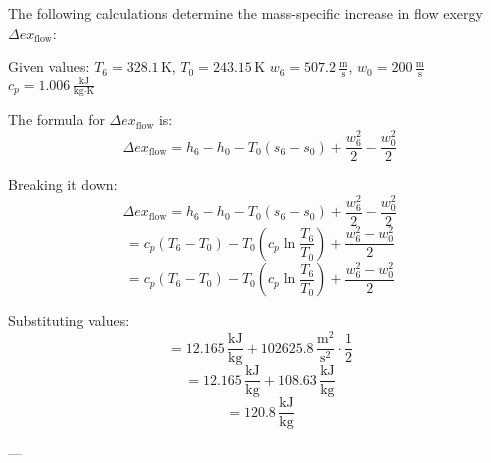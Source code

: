 The following calculations determine the mass-specific increase in flow exergy \( \Delta ex_{\text{flow}} \):

Given values:  
\( T_6 = 328.1 \, \text{K} \), \( T_0 = 243.15 \, \text{K} \)  
\( w_6 = 507.2 \, \frac{\text{m}}{\text{s}} \), \( w_0 = 200 \, \frac{\text{m}}{\text{s}} \)  
\( c_p = 1.006 \, \frac{\text{kJ}}{\text{kg·K}} \)

The formula for \( \Delta ex_{\text{flow}} \) is:  
\[
\Delta ex_{\text{flow}} = h_6 - h_0 - T_0 (s_6 - s_0) + \frac{w_6^2}{2} - \frac{w_0^2}{2}
\]

Breaking it down:  
\[
\Delta ex_{\text{flow}} = h_6 - h_0 - T_0 \left( s_6 - s_0 \right) + \frac{w_6^2}{2} - \frac{w_0^2}{2}
\]  
\[
= c_p (T_6 - T_0) - T_0 \left( c_p \ln \frac{T_6}{T_0} \right) + \frac{w_6^2 - w_0^2}{2}
\]  
\[
= c_p (T_6 - T_0) - T_0 \left( c_p \ln \frac{T_6}{T_0} \right) + \frac{w_6^2 - w_0^2}{2}
\]

Substituting values:  
\[
= 12.165 \, \frac{\text{kJ}}{\text{kg}} + 102625.8 \, \frac{\text{m}^2}{\text{s}^2} \cdot \frac{1}{2}
\]  
\[
= 12.165 \, \frac{\text{kJ}}{\text{kg}} + 108.63 \, \frac{\text{kJ}}{\text{kg}}
\]  
\[
= 120.8 \, \frac{\text{kJ}}{\text{kg}}
\]

---